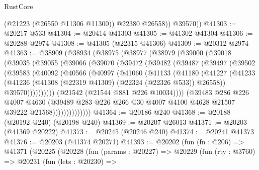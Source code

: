 \begin{lexlean}{RustCore}
\begin{coremodule}
            (@21223 (@26550 @11306 @11300))
            @22380
            @26558))
        @39570))
@41303 := @20217 @533
@41304 := @20414 @41303
@41305 := @41302 @41304
@41306 := @20288 @2974
@41308 := @41305 (@22315 @41306)
@41309 := @20312 @2974
@41363 := @38909
    (@38934
      (@38975
        (@38977
          (@38979
            (@39000
              (@39018
                (@39035
                  (@39055
                    (@39066
                      (@39070
                        (@39472
                          (@39482
                            (@39487
                              (@39497
                                (@39502
                                  (@39583
                                    (@40092
                                      (@40566
                                        (@40997
                                          (@41060
                                            (@41133
                                              (@41180
                                                (@41227
                                                  (@41233
                                                    (@41236
                                                      (@41308
                                                        (@22319 @41309)
                                                        (@22324 (@22326 @533))
                                                        @26558))
                                                    @39570))))))))))
                                (@21542 (@21544 @881 @226 @10034))))
                            (@39483
                              @286
                              @226
                              @4007
                              @4630
                              (@39489
                                @283
                                @226
                                @266
                                @30
                                @4007
                                @4100
                                @4628
                                @21507
                                @39222
                                @21568))))))))))))))
@41364 := @20186 @240
@41368 := @20188 (@20192 @240) (@20198 @240)
@41369 := @20207 @26013
@41371 := @20203 (@41369 @20222)
@41373 := @20245 (@20246 @240)
@41374 := @20241 @41373
@41376 := @20203 (@41374 @20271)
@41393 := @20202
    (fun (fn : @206) =>
    @41371
      (@20225
        (@20228
          (fun (params : @20227) =>
          @20229
            (fun (rty : @3760) =>
            @20231
              (fun (lets : @20230) =>

\end{coremodule}
\end{lexlean}
